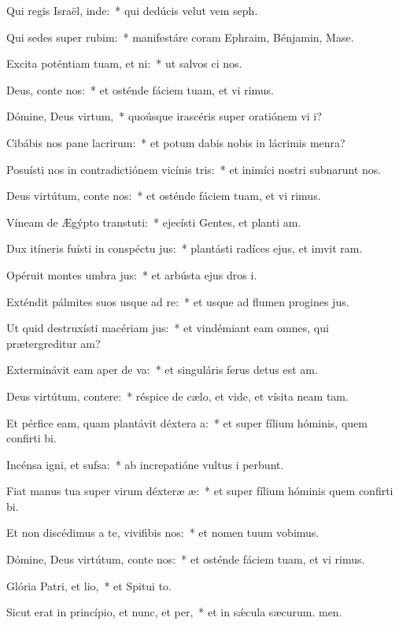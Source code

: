 \item Qui regis Israël, inde:~* qui dedúcis velut vem seph.
\item Qui sedes super rubim:~* manifestáre coram Ephraim, Bénjamin,  Mase.
\item Excita poténtiam tuam, et ni:~* ut salvos ci nos.
\item Deus, conte nos:~* et osténde fáciem tuam, et vi rimus.
\item Dómine, Deus virtum,~* quoúsque irascéris super oratiónem vi i?
\item Cibábis nos pane lacrirum:~* et potum dabis nobis in lácrimis  menra?
\item Posuísti nos in contradictiónem vicínis tris:~* et inimíci nostri subnarunt nos.
\item Deus virtútum, conte nos:~* et osténde fáciem tuam, et vi rimus.
\item Víneam de Ægýpto transtuti:~* ejecísti Gentes, et planti am.
\item Dux itíneris fuísti in conspéctu jus:~* plantásti radíces ejus, et imvit ram.
\item Opéruit montes umbra jus:~* et arbústa ejus dros i.
\item Exténdit pálmites suos usque ad re:~* et usque ad flumen progines jus.
\item Ut quid destruxísti macériam jus:~* et vindémiant eam omnes, qui prætergreditur am?
\item Exterminávit eam aper de va:~* et singuláris ferus detus est am.
\item Deus virtútum, contere:~* réspice de cælo, et vide, et vísita neam tam.
\item Et pérfice eam, quam plantávit déxtera a:~* et super fílium hóminis, quem confirti bi.
\item Incénsa igni, et sufsa:~* ab increpatióne vultus i perbunt.
\item Fiat manus tua super virum déxteræ æ:~* et super fílium hóminis quem confirti bi.
\item Et non discédimus a te, vivifibis nos:~* et nomen tuum vobimus.
\item Dómine, Deus virtútum, conte nos:~* et osténde fáciem tuam, et vi rimus.
\item Glória Patri, et lio,~* et Spitui to.
\item Sicut erat in princípio, et nunc, et per,~* et in sǽcula sæcurum. men.
